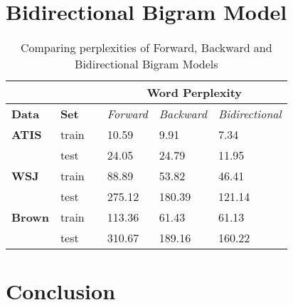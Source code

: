 \documentclass{article}
\begin{document}
\section{Bidirectional Bigram Model}
\begin{table}[h]
\centering
\begin{tabular}{@{}llllll@{}}
\toprule
\textbf{}      & \textbf{}    &  & \multicolumn{3}{c}{\textbf{Word Perplexity}}                  \\ \midrule
\textbf{Data}  & \textbf{Set} &  & \textit{Forward} & \textit{Backward} & \textit{Bidirectional} \\ \midrule
\textbf{ATIS}  & train        &  & 10.59           & 9.91             & 7.34                  \\ \midrule
               & test         &  & 24.05           & 24.79            & 11.95                 \\ \midrule
\textbf{WSJ}   & train        &  & 88.89           & 53.82            & 46.41                 \\ \midrule
               & test         &  & 275.12           & 180.39           & 121.14                \\ \midrule
\textbf{Brown} & train        &  & 113.36          & 61.43            & 61.13                  \\ \midrule
               & test         &  & 310.67          & 189.16           & 160.22               \\ \bottomrule
\end{tabular}
\caption{Comparing perplexities of Forward, Backward and Bidirectional Bigram Models}
\label{all}
\end{table}
\section{Conclusion}
\end{document}

